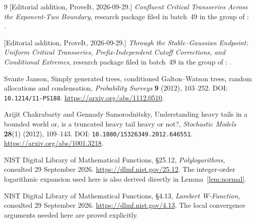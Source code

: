 \documentclass[11pt,a4paper]{article}
\numberwithin{equation}{section}
\theoremstyle{definition}
\theoremstyle{remark}
\begin{document}
\begin{thebibliography}{9}
[Editorial addition, ProveIt, 2026-09-29.]
\emph{Confluent Critical Transseries Across the Exponent-Two Boundary},
research package filed in batch~49 in the group of \cite{repo-index}:
.

[Editorial addition, ProveIt, 2026-09-29.]
\emph{Through the Stable--Gaussian Endpoint: Uniform Critical Transseries,
Prefix-Independent Cutoff Corrections, and Conditional Extremes}, research
package filed in batch~49 in the group of \cite{repo-index}:
.

Svante Janson, Simply generated trees, conditioned Galton--Watson trees,
random allocations and condensation, \emph{Probability Surveys} \textbf{9}
(2012), 103--252. DOI: \texttt{10.1214/11-PS188}.
\url{https://arxiv.org/abs/1112.0510}.

Arijit Chakrabarty and Gennady Samorodnitsky, Understanding heavy tails in a
bounded world or, is a truncated heavy tail heavy or not?,
\emph{Stochastic Models} \textbf{28}(1) (2012), 109--143.
DOI: \texttt{10.1080/15326349.2012.646551}.
\url{https://arxiv.org/abs/1001.3218}.

NIST Digital Library of Mathematical Functions, \S25.12,
\emph{Polylogarithms}, consulted 29 September 2026.
\url{https://dlmf.nist.gov/25.12}.
The integer-order logarithmic expansion used here is also derived directly
in Lemma~\ref{lem:normal}.

NIST Digital Library of Mathematical Functions, \S4.13,
\emph{Lambert W-Function}, consulted 29 September 2026.
\url{https://dlmf.nist.gov/4.13}.
The local convergence arguments needed here are proved explicitly.
\end{thebibliography}
\end{document}
